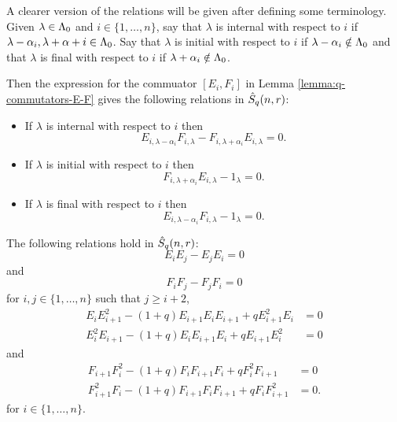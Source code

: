 \documentclass[a4paper, 11pt]{report}
\begin{document}
A clearer version of the relations will be given after defining some terminology. Given $\lambda\in\Lambda_0{}$ and $i\in\{1,\ldots,n\}$, say that $\lambda$ is internal with respect to $i$ if $\lambda-\alpha_i,\lambda+\alpha+i\in\Lambda_0{}$. Say that $\lambda$ is initial with respect to $i$ if $\lambda-\alpha_i\notin\Lambda_0{}$ and that $\lambda$ is final with respect to $i$ if $\lambda+\alpha_i\notin\Lambda_0{}$.

Then the expression for the commuator $\left[E_i,F_i\right]$ in Lemma \ref{lemma:q-commutators-E-F} gives the following relations in $\hat{S}_q(n,r)$:
\begin{itemize}
\item
If $\lambda$ is internal with respect to $i$ then
\begin{equation*}
E_{i,\lambda-\alpha_i}F_{i,\lambda} -F_{i,\lambda+\alpha_i}E_{i,\lambda} = 0.
\end{equation*}
\item
If $\lambda$ is initial with respect to $i$ then
\begin{equation*}
F_{i,\lambda+\alpha_i}E_{i,\lambda} - 1_{\lambda} = 0.
\end{equation*}
\item
If $\lambda$ is final with respect to $i$ then
\begin{equation*}
E_{i,\lambda-\alpha_i}F_{i,\lambda} - 1_{\lambda} = 0.
\end{equation*}
\end{itemize}

\begin{lemma}\label{lemma:q-serre-relations}
The following relations hold in $\hat{S}_q(n,r)$:
\begin{equation*}
E_i E_j - E_j E_i = 0
\end{equation*}
and
\begin{equation*}
F_i F_j - F_j F_i = 0
\end{equation*}
for $i,j\in\{1,\ldots,n\}$ such that $j\geq i+2$,
\begin{align*}
E_i E_{i+1}^2 - (1+q)E_{i+1} E_i E_{i+1} + qE_{i+1}^2 E_i &= 0\\
E_i^2 E_{i+1} - (1+q)E_i E_{i+1} E_i + qE_{i+1} E_i^2 &= 0
\end{align*}
and
\begin{align*}
F_{i+1} F_i^2 - (1+q) F_i F_{i+1} F_i + qF_i^2 F_{i+1} &=0\\
F_{i+1}^2 F_i - (1+q) F_{i+1} F_i F_{i+1} + q F_i F_{i+1}^2 &= 0.
\end{align*}
for $i\in\{1,\ldots,n\}$.
\end{lemma}
\end{document}
